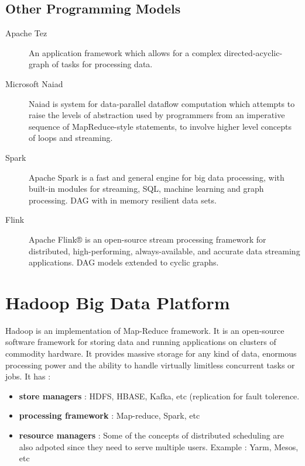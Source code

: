 \documentclass[twoside]{article}
\begin{document}
\subsection{Other Programming Models}
\begin{description}
\item[Apache Tez] An application framework which allows for a complex directed-acyclic-graph of tasks for processing data. 
\item[Microsoft Naiad]Naiad is system for data-parallel dataflow computation which attempts to raise the levels of abstraction used by programmers from an imperative sequence of MapReduce-style statements, to involve higher level concepts of loops and streaming.
\item[Spark]Apache Spark is a fast and general engine for big data processing, with built-in modules for streaming, SQL, machine learning and graph processing. DAG with in memory resilient data sets.
\item[Flink]Apache Flink® is an open-source stream processing framework for distributed, high-performing, always-available, and accurate data streaming applications. DAG models extended to cyclic graphs.
\end{description}

\section{Hadoop Big Data Platform}Hadoop is an implementation of Map-Reduce framework. It is an open-source software framework for storing data and running applications on clusters of commodity hardware. It provides massive storage for any kind of data, enormous processing power and the ability to handle virtually limitless concurrent tasks or jobs. It has :
\begin{itemize}
\item \textbf{store managers} : HDFS, HBASE, Kafka, etc (replication for fault tolerence.
\item \textbf{processing framework} : Map-reduce, Spark, etc
\item \textbf{resource managers} : Some of the concepts of distributed scheduling are also adpoted since they need to serve multiple users. Example : Yarm, Mesos, etc
\end{itemize}
\end{document}
